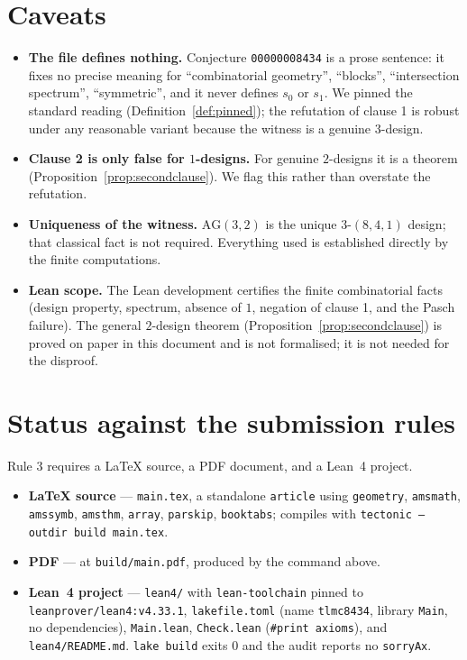 \documentclass[11pt]{article}
\theoremstyle{definition}
\theoremstyle{remark}
\newcommand{\AG}{\mathrm{AG}}
\begin{document}
\section{Caveats}

\begin{itemize}
\item \textbf{The file defines nothing.} Conjecture \texttt{00000008434} is a
  prose sentence: it fixes no precise meaning for ``combinatorial geometry'',
  ``blocks'', ``intersection spectrum'', ``symmetric'', and it never defines
  $s_0$ or $s_1$. We pinned the standard reading (Definition~\ref{def:pinned});
  the refutation of clause 1 is robust under any reasonable variant because
  the witness is a genuine $3$-design.
\item \textbf{Clause 2 is only false for $1$-designs.} For genuine $2$-designs
  it is a theorem (Proposition~\ref{prop:secondclause}). We flag this rather
  than overstate the refutation.
\item \textbf{Uniqueness of the witness.} $\AG(3,2)$ is the unique
  $3$-$(8,4,1)$ design; that classical fact is not required. Everything used is
  established directly by the finite computations.
\item \textbf{Lean scope.} The Lean development certifies the finite
  combinatorial facts (design property, spectrum, absence of $1$, negation of
  clause 1, and the Pasch failure). The general $2$-design theorem
  (Proposition~\ref{prop:secondclause}) is proved on paper in this document and
  is not formalised; it is not needed for the disproof.
\end{itemize}

\section*{Status against the submission rules}

Rule 3 requires a LaTeX source, a PDF document, and a Lean~4 project.

\begin{itemize}
\item \textbf{LaTeX source} --- \texttt{main.tex}, a standalone
  \texttt{article} using \texttt{geometry}, \texttt{amsmath},
  \texttt{amssymb}, \texttt{amsthm}, \texttt{array}, \texttt{parskip},
  \texttt{booktabs}; compiles with
  \texttt{tectonic --outdir build main.tex}.
\item \textbf{PDF} --- at \texttt{build/main.pdf}, produced by the command
  above.
\item \textbf{Lean~4 project} --- \texttt{lean4/} with \texttt{lean-toolchain}
  pinned to \texttt{leanprover/lean4:v4.33.1}, \texttt{lakefile.toml}
  (name \texttt{tlmc8434}, library \texttt{Main}, no dependencies),
  \texttt{Main.lean}, \texttt{Check.lean} (\texttt{\#print axioms}), and
  \texttt{lean4/README.md}. \texttt{lake build} exits $0$ and the audit
  reports no \texttt{sorryAx}.
\end{itemize}
\end{document}
